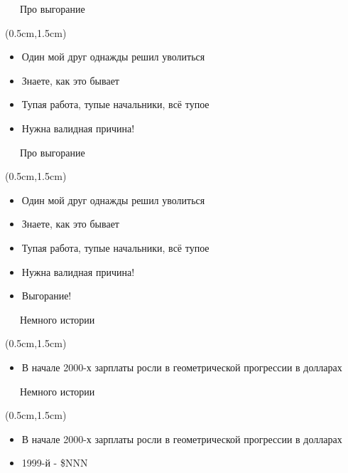 \documentclass[xetex,18pt,aspectratio=43]{beamer}
\begin{document}
\begin{Large}
\begin{frame}{\ \ \ Про выгорание}
\begin{textblock*}{\framewidth-0.8cm}(0.5cm,1.5cm)
\begin{itemize}
  \item Один мой друг однажды решил уволиться
  \item Знаете, как это бывает
  \item Тупая работа, тупые начальники, всё тупое
  \item Нужна валидная причина!
\end{itemize}
\end{textblock*}
\end{frame}

\begin{frame}{\ \ \ Про выгорание}
\begin{textblock*}{\framewidth-0.8cm}(0.5cm,1.5cm)
\begin{itemize}
  \item Один мой друг однажды решил уволиться
  \item Знаете, как это бывает
  \item Тупая работа, тупые начальники, всё тупое
  \item Нужна валидная причина!
  \item Выгорание!
\end{itemize}
\end{textblock*}
\end{frame}

\begin{frame}{\ \ \ Немного истории}
\begin{textblock*}{\framewidth-0.8cm}(0.5cm,1.5cm)
\begin{itemize}
  \item В начале 2000-х зарплаты росли в геометрической прогрессии в долларах
\end{itemize}
\end{textblock*}
\end{frame}

\begin{frame}{\ \ \ Немного истории}
\begin{textblock*}{\framewidth-0.8cm}(0.5cm,1.5cm)
\begin{itemize}
  \item В начале 2000-х зарплаты росли в геометрической прогрессии в долларах
  \item 1999-й - \$NNN
\end{itemize}
\end{textblock*}
\end{frame}


\end{Large}
\end{document}
